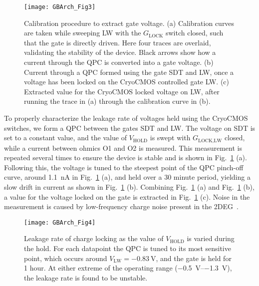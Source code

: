 \begin{figure}
  \texttt{[image: GBArch\_Fig3]}
  \caption[Voltage calibration procedure and hold time]
  {\label{fig:gbvc}Calibration procedure to extract gate voltage. (a) Calibration curves are taken while sweeping LW with the $G_\textrm{LOCK}$ switch closed, such that the gate is directly driven. Here four traces are overlaid, validating the stability of the device. Black arrows show how a current through the QPC is converted into a gate voltage. (b) Current through a QPC formed using the gate SDT and LW, once a voltage has been locked on the CryoCMOS controlled gate LW. (c) Extracted value for the CryoCMOS locked voltage on LW, after running the trace in (a) through the calibration curve in (b).}
\end{figure}

To properly characterize the leakage rate of voltages held using the CryoCMOS switches, we form a QPC between the gates SDT and LW. The voltage on SDT is set to
a constant value, and the value of $V_\textrm{HOLD}$ is swept with $G_\textrm{LOCK,LW}$ closed, while a current between ohmics O1 and O2 is measured. This measurement is
repeated several times to ensure the device is stable and is shown in Fig.~\ref{fig:gbvc} (a). Following this, the voltage is tuned to the steepest point of the QPC pinch-off
curve, around \SI{1.1}{\nano\ampere} in Fig.~\ref{fig:gbvc} (a), and held over a 30 minute period, yielding a slow drift in current as shown in Fig.~\ref{fig:gbvc} (b).
Combining Fig.~\ref{fig:gbvc} (a) and Fig.~\ref{fig:gbvc} (b), a value for the voltage locked on the gate is extracted in Fig.~\ref{fig:gbvc} (c). Noise in the measurement
is caused by low-frequency charge noise present in the 2DEG~\cite{PhysRevApplied.9.034008}.

\begin{figure}
  \texttt{[image: GBArch\_Fig4]}
  \caption[Leakage rate of charge locking]
  {\label{fig:gblr}Leakage rate of charge locking as the value of $V_\textrm{HOLD}$ is varied during the hold. For each datapoint the QPC is tuned to its most sensitive point,
  which occurs around $V_\textrm{LW} = \SI{-0.83}{\volt}$, and the gate is held for 1 hour. At either extreme of the operating range (\SIrange{-0.5}{-1.3}{\volt}), the leakage
  rate is found to be unstable.}
\end{figure}

